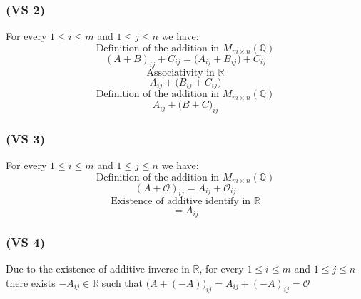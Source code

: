 \documentclass{article}
\begin{document}
\subsubsection*{(VS 2)}
For every \(1 \leq i \leq m\) and \(1 \leq j \leq n\) we have:
\begin{equation*}
    \text{Definition of the addition in \(M_{m \times n}(\mathbb{Q})\)}
\end{equation*}
\begin{equation*}
    (A + B)_{ij} + C_{ij} = \Big(A_{ij} + B_{ij}\Big) + C_{ij}
\end{equation*}
\begin{equation*}
    \text{Associativity in \(\mathbb{R}\)}
\end{equation*}
\begin{equation*}
    A_{ij} + \Big(B_{ij} + C_{ij}\Big)
\end{equation*}
\begin{equation*}
    \text{Definition of the addition in \(M_{m \times n}(\mathbb{Q})\)}
\end{equation*}
\begin{equation*}
    A_{ij} + \Big(B + C\Big)_{ij}
\end{equation*}
    
\subsubsection*{(VS 3)}

For every \(1 \leq i \leq m\) and \(1 \leq j \leq n\) we have:
\begin{equation*}
    \text{Definition of the addition in \(M_{m \times n}(\mathbb{Q})\)}
\end{equation*}
\begin{equation*}
    (A + \mathcal{O})_{ij} = A_{ij} + \mathcal{O}_{ij} 
\end{equation*}
\begin{equation*}
    \text{Existence of additive identify in \(\mathbb{R}\)}
\end{equation*}
\begin{equation*}
    = A_{ij}
\end{equation*}


\subsubsection*{(VS 4)}

Due to the existence of additive inverse in \(\mathbb{R}\), for every \(1 \leq i \leq m\) and \(1 \leq j \leq n\)
there exists \(-A_{ij} \in \mathbb{R}\) such that \(\Big(A + (-A)\Big)_{ij} = A_{ij} + (-A)_{ij} = \mathcal{O}\)
\end{document}
